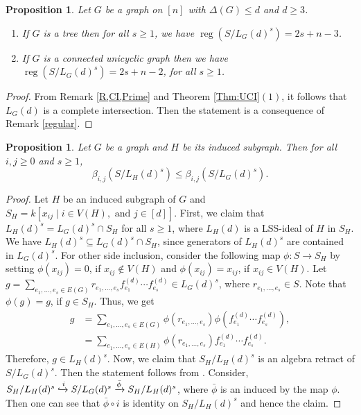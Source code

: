 \documentclass[11pt,a4paper,reqno]{amsart}
\newtheorem{prop}[thm]{Proposition}
\theoremstyle{definition}
\numberwithin{equation}{section}
\DeclareMathOperator{\reg}{reg}
\begin{document}
\vspace{1mm}

\begin{prop}\label{rem:CIreg}
    Let $G$ be a graph on $[n]$ with $ \Delta(G) \leq d$ and $d \geq 3$. 
    \begin{enumerate}
        \item If $G$ is a tree then for all $s\geq 1$, we have $\reg (S/L_{G}(d)^s) = 2s + n-3$.
        \item If $G$ is a connected unicyclic graph then we have $\reg (S/L_{G}(d)^s) = 2s + n-2$, for all $s\geq 1$.
    \end{enumerate}
\end{prop} 

\begin{proof}
    From Remark \ref{R,CI,Prime} and Theorem \ref{Thm:UCI}$(1)$, it follows that $L_G(d)$ is a complete intersection. Then the statement is a consequence of Remark \ref{regular}.
\end{proof}





\begin{prop} \label{pro:ij}
    Let $G$ be a graph and $H$ be its induced subgraph. Then for all $i, j \geq 0$ and $s \geq 1$, $$ \beta_{i,j}(S/L_H(d)^s) \leq \beta_{i,j}(S/L_G(d)^s).$$
\end{prop}
\begin{proof}
    Let $H$ be an induced subgraph of $G$ and $S_H=k[x_{ij} \mid i \in V(H), \text{ and } j \in [d]]$. First, we claim that $L_H(d)^s = L_G(d)^s \cap S_H$ for all $s \geq 1$, where $L_H(d)$ is a LSS-ideal of $H$ in $S_H$. We have $L_H(d)^s\subseteq L_G(d)^s\cap S_H$, since generators of $L_H(d)^s$ are contained in $L_G(d)^s$. For other side inclusion, consider the following map $\phi : S \rightarrow S_H$ by setting $\phi(x_{ij})=0$, if $x_{ij}\notin V(H)$ and $\phi(x_{ij})=x_{ij}$, if $x_{ij}\in V(H)$. Let $g=\sum_{e_1,\ldots,e_s \in E(G)}r_{e_1,\ldots,e_s}f_{e_1}^{(d)}\cdots f_{e_s}^{(d)} \in L_G(d)^s$, where $r_{e_1,\ldots,e_s} \in S$. Note that $\phi(g) = g$, if $g\in S_H$. Thus, we get
    \begin{equation*}
        \begin{split}
            g &= \sum_{e_1,\ldots,e_s \in E(G)}\phi(r_{e_1,\ldots,e_s})\phi(f_{e_1}^{(d)}\cdots f_{e_s}^{(d)}), \\
            &= \sum_{e_1,\ldots,e_s \in E(H)}\phi(r_{e_1,\ldots,e_s})f_{e_1}^{(d)}\cdots f_{e_s}^{(d)}.
        \end{split}
    \end{equation*}
    Therefore, $g \in L_H(d)^s$.  Now, we claim that ${S_H}/{L_H(d)^s}$ is an algebra retract of ${S}/{L_G(d)^s}$. Then the statement follows from \cite[Corollary 2.5]{OHH2000}. Consider, ${S_H}/{L_H(d)^s} \xhookrightarrow{i} {S}/{L_G(d)^s} \xrightarrow{\bar{\phi}} {S_H}/{L_H(d)^s}$, where $\bar{\phi}$ is an induced by the map $\phi$. Then one can see that $\bar{\phi} \circ i$ is identity on ${S_H}/{L_H(d)^s}$ and hence the claim.
\end{proof}
\end{document}
